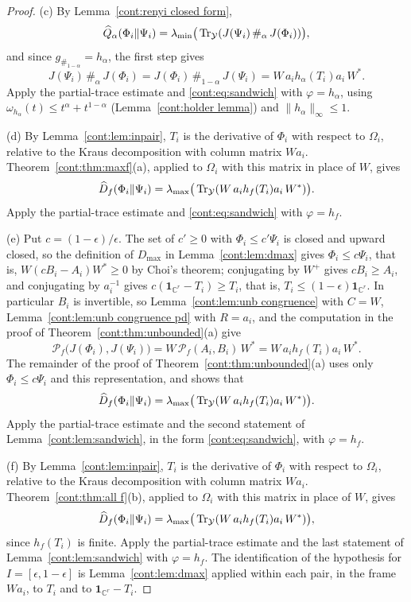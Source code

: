 \begin{proof}
(c) By Lemma~\ref{cont:renyi closed form},
\[
\widehat{Q}_\alpha(\Phi_i\|\Psi_i)=\lambda_{\min}\big(\operatorname{Tr}_{\mathcal{Y}}(J(\Psi_i)\,\#_\alpha\,J(\Phi_i))\big),
\]
and since $g_{\#_{1-\alpha}}=h_\alpha$, the first step gives
\[
J(\Psi_i)\,\#_\alpha\,J(\Phi_i)=J(\Phi_i)\,\#_{1-\alpha}\,J(\Psi_i)=W\,a_ih_\alpha(T_i)a_i\,W^*.
\]
Apply the partial-trace estimate and \eqref{cont:eq:sandwich} with $\varphi=h_\alpha$, using $\omega_{h_\alpha}(t)\leq t^\alpha+t^{1-\alpha}$ (Lemma~\ref{cont:holder lemma}) and $\|h_\alpha\|_\infty\leq1$.

(d) By Lemma~\ref{cont:lem:inpair}, $T_i$ is the derivative of $\Phi_i$ with respect to $\Omega_i$, relative to the Kraus decomposition with column matrix $Wa_i$. Theorem~\ref{cont:thm:maxf}(a), applied to $\Omega_i$ with this matrix in place of $W$, gives
\[
\widehat{D}_f(\Phi_i\|\Psi_i)=\lambda_{\max}\big(\operatorname{Tr}_{\mathcal{Y}}(W\,a_ih_f(T_i)a_i\,W^*)\big).
\]
Apply the partial-trace estimate and \eqref{cont:eq:sandwich} with $\varphi=h_f$.

(e) Put $c=(1-\epsilon)/\epsilon$. The set of $c'\geq0$ with $\Phi_i\leq c'\Psi_i$ is closed and upward closed, so the definition of $D_{\max}$ in Lemma~\ref{cont:lem:dmax} gives $\Phi_i\leq c\Psi_i$, that is, $W(cB_i-A_i)W^*\geq0$ by Choi's theorem; conjugating by $W^+$ gives $cB_i\geq A_i$, and conjugating by $a_i^{-1}$ gives $c(\mathbf{1}_{\mathbb{C}^r}-T_i)\geq T_i$, that is, $T_i\leq(1-\epsilon)\mathbf{1}_{\mathbb{C}^r}$. In particular $B_i$ is invertible, so Lemma~\ref{cont:lem:unb congruence} with $C=W$, Lemma~\ref{cont:lem:unb congruence pd} with $R=a_i$, and the computation in the proof of Theorem~\ref{cont:thm:unbounded}(a) give
\[
\mathcal{P}_f\big(J(\Phi_i),J(\Psi_i)\big)=W\,\mathcal{P}_f(A_i,B_i)\,W^*=W\,a_ih_f(T_i)a_i\,W^*.
\]
The remainder of the proof of Theorem~\ref{cont:thm:unbounded}(a) uses only $\Phi_i\leq c\Psi_i$ and this representation, and shows that
\[
\widehat{D}_f(\Phi_i\|\Psi_i)=\lambda_{\max}\big(\operatorname{Tr}_{\mathcal{Y}}(W\,a_ih_f(T_i)a_i\,W^*)\big).
\]
Apply the partial-trace estimate and the second statement of Lemma~\ref{cont:lem:sandwich}, in the form \eqref{cont:eq:sandwich}, with $\varphi=h_f$.

(f) By Lemma~\ref{cont:lem:inpair}, $T_i$ is the derivative of $\Phi_i$ with respect to $\Omega_i$, relative to the Kraus decomposition with column matrix $Wa_i$. Theorem~\ref{cont:thm:all f}(b), applied to $\Omega_i$ with this matrix in place of $W$, gives
\[
\widehat{D}_f(\Phi_i\|\Psi_i)=\lambda_{\max}\big(\operatorname{Tr}_{\mathcal{Y}}(W\,a_ih_f(T_i)a_i\,W^*)\big),
\]
since $h_f(T_i)$ is finite. Apply the partial-trace estimate and the last statement of Lemma~\ref{cont:lem:sandwich} with $\varphi=h_f$. The identification of the hypothesis for $I=[\epsilon,1-\epsilon]$ is Lemma~\ref{cont:lem:dmax} applied within each pair, in the frame $Wa_i$, to $T_i$ and to $\mathbf{1}_{\mathbb{C}^r}-T_i$.


\end{proof}
